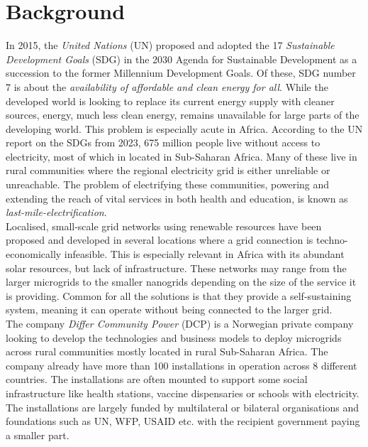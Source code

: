 \section{Background}

In 2015, the \textit{United Nations} (UN) proposed and adopted the 17 \textit{Sustainable Development Goals} (SDG) in the 2030 Agenda for Sustainable Development\cite{2030agenda} as a succession to the former Millennium Development Goals. Of these, SDG number 7 is about the \textit{availability of affordable and clean energy for all}\cite{un_sdg_7}. While the developed world is looking to replace its current energy supply with cleaner sources, energy, much less clean energy, remains unavailable for large parts of the developing world. This problem is especially acute in Africa. According to the UN report on the SDGs from 2023, 675 million people live without access to electricity, most of which in located in Sub-Saharan Africa.\cite{Desa2023-mr} Many of these live  in rural communities where the regional electricity grid is either unreliable or unreachable. The problem of electrifying these communities, powering and extending the reach of vital services in both health and education, is known as \textit{last-mile-electrification}.\\

Localised, small-scale grid networks using renewable resources have been proposed and developed in several locations where a grid connection is techno-economically infeasible. This is especially relevant in Africa with its abundant solar resources, but lack of infrastructure.\cite{Wang2021-kb} These networks may range from the larger microgrids to the smaller nanogrids depending on the size of the service it is providing. Common for all the solutions is that they provide a self-sustaining system, meaning it can operate without being connected to the larger grid.\\

The company \textit{Differ Community Power} (DCP) is a Norwegian private company looking to develop the technologies and business models to deploy microgrids across rural communities mostly located in rural Sub-Saharan Africa. The company already have more than 100 installations in operation across 8 different countries. The installations are often mounted to support some social infrastructure like health stations, vaccine dispensaries or schools with electricity. The installations are largely funded by multilateral or bilateral organisations and foundations such as UN, WFP, USAID etc. with the recipient government paying a smaller part.\\

